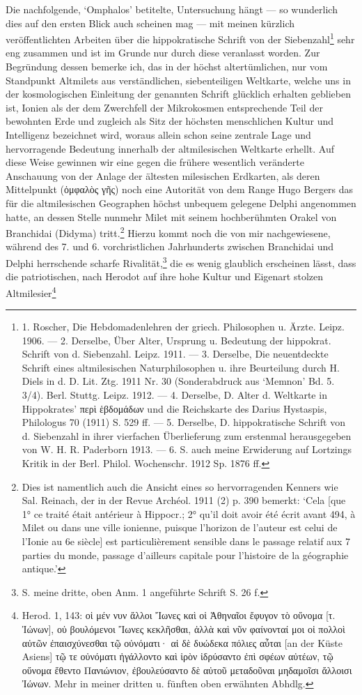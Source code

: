 \documentclass[a4paper, 11pt, oneside]{article}
\begin{document}
Die nachfolgende, `Omphalos' betitelte, Untersuchung hängt --- so wunderlich dies auf den ersten Blick auch scheinen mag --- mit meinen kürzlich veröffentlichten Arbeiten über die hippokratische Schrift von der Siebenzahl\footnote{1. Roscher, Die Hebdomadenlehren der griech. Philosophen u. Ärzte. Leipz. 1906. --- 2. Derselbe, Über Alter, Ursprung u. Bedeutung der hippokrat. Schrift von d. Siebenzahl. Leipz. 1911. --- 3. Derselbe, Die neuentdeckte Schrift eines altmilesischen Naturphilosophen u. ihre Beurteilung durch H. Diels in d. D. Lit. Ztg. 1911 Nr. 30 (Sonderabdruck aus `Memnon' Bd. 5. 3/4). Berl. Stuttg. Leipz. 1912. --- 4. Derselbe, D. Alter d. Weltkarte in Hippokrates' περὶ ἑβδομάδων und die Reichskarte des Darius Hystaspis, Philologus 70 (1911) S. 529 ff. --- 5. Derselbe, D. hippokratische Schrift von d. Siebenzahl in ihrer vierfachen Überlieferung zum erstenmal herausgegeben von W. H. R. Paderborn 1913. --- 6. S. auch meine Erwiderung auf Lortzings Kritik in der Berl. Philol. Wochenschr. 1912 Sp. 1876 ff.} sehr eng zusammen und ist im Grunde nur durch diese veranlasst worden. Zur Begründung dessen bemerke ich, das in der höchst altertümlichen, nur vom Standpunkt Altmilets aus verständlichen, siebenteiligen Weltkarte, welche uns in der kosmologischen Einleitung der genannten Schrift glücklich erhalten geblieben ist, Ionien als der dem Zwerchfell der Mikrokosmen entsprechende Teil der bewohnten Erde und zugleich als Sitz der höchsten menschlichen Kultur und Intelligenz bezeichnet wird, woraus allein schon seine zentrale Lage und hervorragende Bedeutung innerhalb der altmilesischen Weltkarte erhellt. Auf diese Weise gewinnen wir eine gegen die frühere wesentlich veränderte Anschauung von der Anlage der ältesten milesischen Erdkarten, als deren Mittelpunkt (ὀμφαλὸς γῆς) noch eine Autorität von dem Range Hugo Bergers das für die altmilesischen Geographen höchst unbequem gelegene Delphi angenommen hatte, an dessen Stelle nunmehr Milet mit seinem hochberühmten Orakel von Branchidai (Didyma) tritt.\footnote{Dies ist namentlich auch die Ansicht eines so hervorragenden Kenners wie Sal. Reinach, der in der Revue Archéol. 1911 (2) p. 390 bemerkt: `Cela [que 1° ce traité était antérieur à Hippocr.; 2° qu'il doit avoir été écrit avant 494, à Milet ou dans une ville ionienne, puisque l'horizon de l'auteur est celui de l'Ionie au 6e siècle] est particulièrement sensible dans le passage relatif aux 7 parties du monde, passage d'ailleurs capitale pour l'histoire de la géographie antique.'} Hierzu kommt noch die von mir nachgewiesene, während des 7. und 6. vorchristlichen Jahrhunderts zwischen Branchidai und Delphi herrschende scharfe Rivalität,\footnote{S. meine dritte, oben Anm. 1 angeführte Schrift S. 26 f.} die es wenig glaublich erscheinen lässt, dass die patriotischen, nach Herodot auf ihre hohe Kultur und Eigenart stolzen Altmilesier\footnote{Herod. 1, 143: οἱ μέν νυν ἄλλοι Ἴωνες καὶ οἱ Ἀθηναῖοι ἔφυγον τὸ οὔνομα [τ. Ἰώνων], οὐ βουλόμενοι Ἴωνες κεκλῆσθαι, ἀλλὰ καὶ νῦν φαίνονταί μοι οἱ πολλοὶ αὐτῶν ἐπαισχύνεσθαι τῷ οὐνόματι· αἱ δὲ δυώδεκα πόλιες αὖται [an der Küste Asiens] τῷ τε οὐνόματι ἠγάλλοντο καὶ ἱρὸν ἱδρύσαντο ἐπὶ σφέων αὐτέων, τῷ οὔνομα ἔθεντο Πανιώνιον, ἐβουλεύσαντο δὲ αὐτοῦ μεταδοῦναι μηδαμοῖσι ἄλλοισι Ἰώνων. Mehr in meiner dritten u. fünften oben erwähnten Abhdlg.} 
\end{document}
